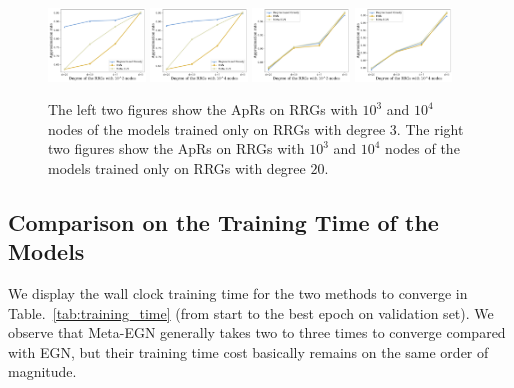 \begin{figure}[h]
     \centering
         \includegraphics[width=0.23\textwidth]{iclr2023/img/app/mis_10_3_app3.pdf}
     \hfill
         \includegraphics[width=0.23\textwidth]{iclr2023/img/app/mis_10_4_app3_.pdf}
     \hfill
         \includegraphics[width=0.23\textwidth]{iclr2023/img/app/mis_10_3_app20.pdf}
    \hfill
        \includegraphics[width=0.23\textwidth]{iclr2023/img/app/mis_10_4_app20.pdf}
     \vspace{-0.3cm}
        \caption{The left two figures show the ApRs on RRGs with $10^3$ and $10^4$ nodes of the models trained only on RRGs with degree $3$. The right two figures show the ApRs on RRGs with $10^3$ and $10^4$ nodes of the models trained only on RRGs with degree $20$.}
        \label{fig:train_only3_20}
        \vspace{-0.3cm}
\end{figure}

\subsection{Comparison on the Training Time of the Models}
We display the wall clock training time for the two methods to converge in Table.~\ref{tab:training_time} (from start to the best epoch on validation set). We observe that Meta-EGN generally takes two to three times to converge compared with EGN, but their training time cost basically remains on the same order of magnitude.

